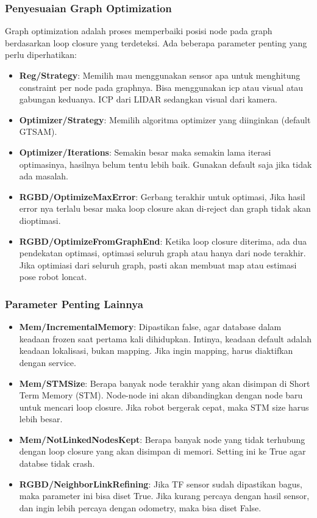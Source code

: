 \documentclass{article}
\begin{document}
\subsubsection{Penyesuaian Graph Optimization}
Graph optimization adalah proses memperbaiki posisi node pada graph berdasarkan loop closure yang terdeteksi. Ada beberapa parameter penting yang perlu diperhatikan:
\begin{itemize}
  \item \textbf{Reg/Strategy}: Memilih mau menggunakan sensor apa untuk menghitung constraint per node pada graphnya. Bisa menggunakan icp atau visual atau gabungan keduanya. ICP dari LIDAR sedangkan visual dari kamera. 
  \item \textbf{Optimizer/Strategy}: Memilih algoritma optimizer yang diinginkan (default GTSAM).
  \item \textbf{Optimizer/Iterations}: Semakin besar maka semakin lama iterasi optimasinya, hasilnya belum tentu lebih baik. Gunakan default saja jika tidak ada masalah.
  \item \textbf{RGBD/OptimizeMaxError}: Gerbang terakhir untuk optimasi, Jika hasil error nya terlalu besar maka loop closure akan di-reject dan graph tidak akan dioptimasi. 
  \item \textbf{RGBD/OptimizeFromGraphEnd}: Ketika loop closure diterima, ada dua pendekatan optimasi, optimasi seluruh graph atau hanya dari node terakhir. Jika optimiasi dari seluruh graph, pasti akan membuat map atau estimasi pose robot loncat.
\end{itemize}

\subsubsection{Parameter Penting Lainnya}
\begin{itemize}
  \item \textbf{Mem/IncrementalMemory}: Dipastikan false, agar database dalam keadaan frozen saat pertama kali dihidupkan. Intinya, keadaan default adalah keadaan lokalisasi, bukan mapping. Jika ingin mapping, harus diaktifkan dengan service.
  \item \textbf{Mem/STMSize}: Berapa banyak node terakhir yang akan disimpan di Short Term Memory (STM). Node-node ini akan dibandingkan dengan node baru untuk mencari loop closure. Jika robot bergerak cepat, maka STM size harus lebih besar.
  \item \textbf{Mem/NotLinkedNodesKept}: Berapa banyak node yang tidak terhubung dengan loop closure yang akan disimpan di memori. Setting ini ke True agar databse tidak crash. 
  \item \textbf{RGBD/NeighborLinkRefining}: Jika TF sensor sudah dipastikan bagus, maka parameter ini bisa diset True. Jika kurang percaya dengan hasil sensor, dan ingin lebih percaya dengan odometry, maka bisa diset False.
\end{itemize}
\end{document}
